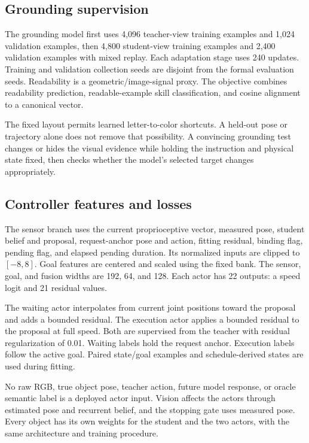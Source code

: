 \subsection{Grounding supervision}
The grounding model first uses 4,096 teacher-view training examples and 1,024 validation examples, then 4,800 student-view training examples and 2,400 validation examples with mixed replay. Each adaptation stage uses 240 updates. Training and validation collection seeds are disjoint from the formal evaluation seeds. Readability is a geometric/image-signal proxy. The objective combines readability prediction, readable-example skill classification, and cosine alignment to a canonical vector.

The fixed layout permits learned letter-to-color shortcuts. A held-out pose or trajectory alone does not remove that possibility. A convincing grounding test changes or hides the visual evidence while holding the instruction and physical state fixed, then checks whether the model's selected target changes appropriately.

\subsection{Controller features and losses}
The sensor branch uses the current proprioceptive vector, measured pose, student belief and proposal, request-anchor pose and action, fitting residual, binding flag, pending flag, and elapsed pending duration. Its normalized inputs are clipped to $[-8,8]$. Goal features are centered and scaled using the fixed bank. The sensor, goal, and fusion widths are 192, 64, and 128. Each actor has 22 outputs: a speed logit and 21 residual values.

The waiting actor interpolates from current joint positions toward the proposal and adds a bounded residual. The execution actor applies a bounded residual to the proposal at full speed. Both are supervised from the teacher with residual regularization of 0.01. Waiting labels hold the request anchor. Execution labels follow the active goal. Paired state/goal examples and schedule-derived states are used during fitting.

No raw RGB, true object pose, teacher action, future model response, or oracle semantic label is a deployed actor input. Vision affects the actors through estimated pose and recurrent belief, and the stopping gate uses measured pose. Every object has its own weights for the student and the two actors, with the same architecture and training procedure.

